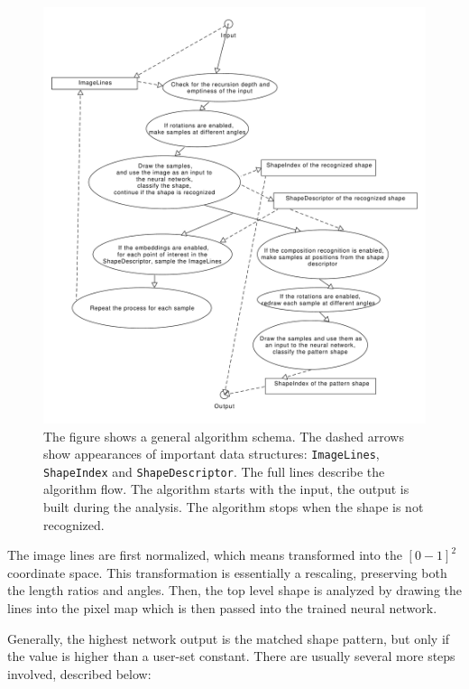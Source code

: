 \begin{figure}[p]
\centering
\includegraphics[width=.9\linewidth]{ext/images/algoschema.pdf}
\caption{The figure shows a general algorithm schema. The dashed arrows show appearances of important data structures: \texttt{ImageLines}, \texttt{ShapeIndex} and \texttt{ShapeDescriptor}. The full lines describe the algorithm flow. The algorithm starts with the input, the output is built during the analysis. The algorithm stops when the shape is not recognized.}
\label{fig:algoschema}
\end{figure}

The image lines are first normalized, which means  transformed into the $[0-1]^2$ coordinate space. This transformation is essentially a rescaling, preserving both the length ratios and angles. Then, the top level shape is analyzed by drawing  the lines into the pixel map\XX{,} which is then passed into the trained neural network. 

Generally, the highest network output is  the matched shape pattern, but only if the value is higher than a user-set constant. There are  usually several more steps involved, described below:

